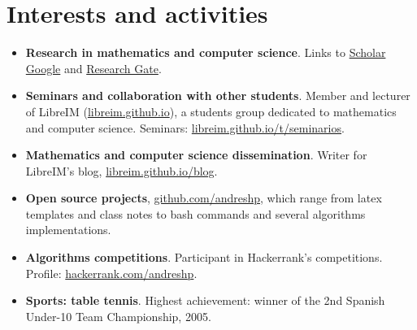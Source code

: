 \documentclass[10pt,a4paper,sans]{moderncv} %
\begin{document}
\section{Interests and activities}
\begin{itemize}
    \item \textbf{Research in mathematics and computer science}. Links to \textcolor{colorl}{\href{https://scholar.google.es/citations?user=oLAt2JsAAAAJ&hl=es}{Scholar Google}} and \textcolor{colorl}{\href{https://www.researchgate.net/profile/Andres_Herrera-Poyatos}{Research Gate}}.
    \item \textbf{Seminars and collaboration with other students}. Member and lecturer of LibreIM (\textcolor{colorl}{\url{libreim.github.io}}), a students group dedicated to mathematics and computer science.
      Seminars: \textcolor{colorl}{\url{libreim.github.io/t/seminarios}}.
    \item \textbf{Mathematics and computer science dissemination}. Writer for LibreIM's blog, \textcolor{colorl}{\url{libreim.github.io/blog}}.
    \item \textbf{Open source projects}, \textcolor{colorl}{\url{github.com/andreshp}}, which range from latex templates and class notes to bash commands and several algorithms implementations.
    \item \textbf{Algorithms competitions}. Participant in Hackerrank's competitions. Profile: \textcolor{colorl}{\url{hackerrank.com/andreshp}}.
    \item \textbf{Sports: table tennis}. Highest achievement: winner of the 2nd Spanish Under-10 Team Championship, 2005.
\end{itemize}
\end{document}
